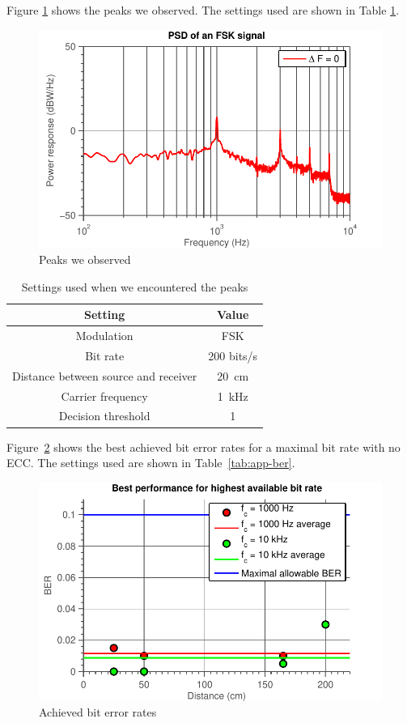 \documentclass[11pt,titlepage]{report}
\begin{document}
\begin{appendices}
Figure \ref{fig:app-fsk-peaks} shows the peaks we observed. The settings used are shown in Table \ref{tab:app-fsk-peaks-settings}.

\begin{figure}[H]
	\begin{center}
		\includegraphics[width=0.8\linewidth]{resource/fsk-mod-1st.pdf}
	\end{center}
	\caption{Peaks we observed}
	\label{fig:app-fsk-peaks}
\end{figure}

\begin{table}[H]
	\centering
	\caption{Settings used when we encountered the peaks}
	\label{tab:app-fsk-peaks-settings}
	\begin{tabular}{c c}
		\hline\hline
		Setting & Value \\
		\hline
		Modulation & FSK \\
		Bit rate & \num{200} bits/s \\
		Distance between source and receiver & \SI{20}{cm} \\
		Carrier frequency & \SI{1}{kHz} \\
		Decision threshold & \num{1} \\
		\hline
	\end{tabular}
\end{table}

Figure~\ref{fig:app-ber} shows the best achieved bit error rates for a maximal bit rate with no ECC. The settings used are shown in Table~\ref{tab:app-ber}.

\begin{figure}[H]
	\begin{center}
		\includegraphics[width=0.8\linewidth]{resource/task-5.pdf}
	\end{center}
	\caption{Achieved bit error rates}
	\label{fig:app-ber}
\end{figure}


\end{appendices}
\end{document}
